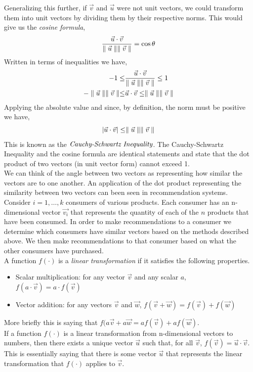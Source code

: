 \documentclass[12pt]{article}
\begin{document}
Generalizing this further, if $\vec{v}$ and $\vec{u}$ were not unit vectors, we could transform them into unit vectors by dividing them by their respective norms. This would give us the \emph{cosine formula},
\[
\frac{\vec{u}\cdot\vec{v}}{\parallel\vec{u}\parallel\parallel\vec{v}\parallel} = \cos{\theta}
\]
Written in terms of inequalities we have,
\begin{align*}
-1 \leq &\frac{\vec{u}\cdot\vec{v}}{\parallel\vec{u}\parallel\parallel\vec{v}\parallel} \leq 1 \\
-\parallel\vec{u}\parallel\parallel\vec{v}\parallel \leq &\vec{u}\cdot\vec{v} \leq \parallel\vec{u}\parallel\parallel\vec{v}\parallel
\end{align*}
Applying the absolute value and since, by definition, the norm must be positive we have,
\[
|\vec{u}\cdot\vec{v}| \leq \parallel\vec{u}\parallel\parallel\vec{v}\parallel
\]
This is known as the $\emph{Cauchy-Schwartz Inequality}$. The Cauchy-Schwartz Inequality and the cosine formula are identical statements and state that the dot product of two vectors (in unit vector form) cannot exceed 1. \\

We can think of the angle between two vectors as representing how similar the vectors are to one another. An application of the dot product representing the similarity between two vectors can been seen in recommendation systems. Consider $i=1,\ldots,k$ consumers of various products. Each consumer has an n-dimensional vector $\vec{v_i}$ that represents the quantity of each of the $n$ products that have been consumed. In order to make recommendations to a consumer we determine which consumers have similar vectors based on the methods described above. We then make recommendations to that consumer based on what the other consumers have purchased. \\

A function $f(\cdot)$ is a \emph{linear transformation} if it satisfies the following properties.
\begin{itemize}
\item Scalar multiplication: for any vector $\vec{v}$ and any scalar $a$, $f(a\cdot\vec{v})=a\cdot f(\vec{v})$ 
\item Vector addition: for any vectors $\vec{v}$ and $\vec{w}$, $f(\vec{v}+\vec{w}) = f(\vec{v})+f(\vec{w})$ \\
\end{itemize}

More briefly this is saying that $f(a\vec{v}+a\vec{w}=af(\vec{v})+af(\vec{w})$. \\

If a function $f(\cdot)$ is a linear transformation from n-dimensional vectors to numbers, then there exists a unique vector $\vec{u}$ such that, for all $\vec{v}$, $f(\vec{v}) = \vec{u}\cdot\vec{v}$. This is essentially saying that there is some vector $\vec{u}$ that represents the linear transformation that $f(\cdot)$ applies to $\vec{v}$. \\
\end{document}
